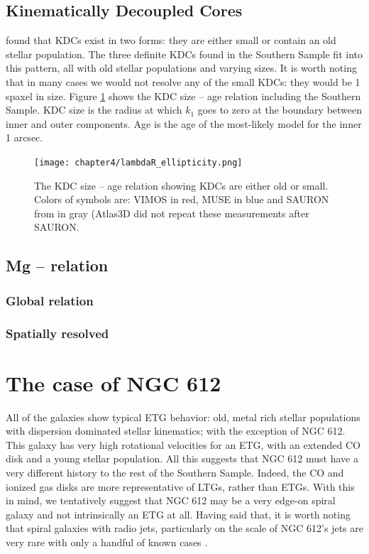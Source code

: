 	\subsection{Kinematically Decoupled Cores}
		\label{sec:popKDC}

		\citet{Kuntschner2010} found that KDCs exist in two forms: they are either small or contain an old stellar population. The three definite KDCs found in the Southern Sample fit into this pattern, all with old stellar populations and varying sizes. It is worth noting that in many cases we would not resolve any of the small KDCs: they would be 1 spaxel in size. Figure \ref{fig:KDC} shows the KDC size -- age relation including the Southern Sample. KDC size is the radius at which $k_1$ goes to zero at the boundary between inner and outer components. Age is the age of the most-likely model for the inner 1 arcsec. 

		\begin{figure}
			\centering
			\texttt{[image: chapter4/lambdaR\_ellipticity.png]}
			\caption[KDC dichotomy]{The KDC size -- age relation showing KDCs are either old or small. Colors of symbols are: VIMOS in red, MUSE in blue and SAURON from \citet{Kuntschner2010} in gray (Atlas3D did not repeat these measurements after SAURON.}
			\label{fig:KDC}
		\end{figure}


	\subsection{Mg -- \textsigma relation}
		\label{subsec:Mgsigma}

		\subsubsection{Global relation}

		\subsubsection{Spatially resolved}

\section{The case of NGC 612}
	\label{sec:NGC612}
	All of the galaxies show typical ETG behavior: old, metal rich stellar populations with dispersion dominated stellar kinematics; with the exception of NGC 612. This galaxy has very high rotational velocities for an ETG, with an extended CO disk and a young stellar population. All this suggests that NGC 612 must have a very different history to the rest of the Southern Sample. Indeed, the CO and ionized gas disks are more representative of LTGs, rather than ETGs. With this in mind, we tentatively suggest that NGC 612 may be a very edge-on spiral galaxy and not intrinsically an ETG at all. Having said that, it is worth noting that spiral galaxies with radio jets, particularly on the scale of NGC 612's jets are very rare with only a handful of known cases \citep{}. 